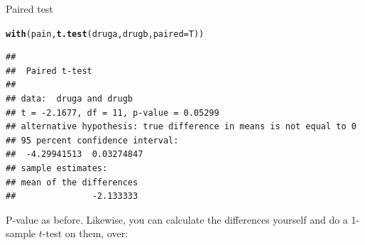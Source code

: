 \documentclass[unknownkeysallowed]{beamer}\usepackage[]{graphicx}\usepackage[]{color}
\makeatletter
\newcommand{\hlstd}[1]{\textcolor[rgb]{0.345,0.345,0.345}{#1}}%
\newcommand{\hlkwc}[1]{\textcolor[rgb]{0.333,0.667,0.333}{#1}}%
\newcommand{\hlkwd}[1]{\textcolor[rgb]{0.737,0.353,0.396}{\textbf{#1}}}%
\newenvironment{kframe}{%
 \def\at@end@of@kframe{}%
 \ifinner\ifhmode%
  \def\at@end@of@kframe{\end{minipage}}%
  \begin{minipage}{\columnwidth}%
 \fi\fi%
 \def\FrameCommand##1{\hskip\@totalleftmargin \hskip-\fboxsep
 \colorbox{shadecolor}{##1}\hskip-\fboxsep
     \hskip-\linewidth \hskip-\@totalleftmargin \hskip\columnwidth}%
 \MakeFramed {\advance\hsize-\width
   \@totalleftmargin\z@ \linewidth\hsize
   \@setminipage}}%
 {\par\unskip\endMakeFramed%
 \at@end@of@kframe}
\newenvironment{knitrout}{}{} %
\makeatother
\begin{document}
\begin{frame}[fragile]{Paired test}

  
\begin{knitrout}
\color{fgcolor}\begin{kframe}
\begin{alltt}
\hlkwd{with}\hlstd{(pain,}\hlkwd{t.test}\hlstd{(druga,drugb,}\hlkwc{paired}\hlstd{=T))}
\end{alltt}
\begin{verbatim}
## 
## 	Paired t-test
## 
## data:  druga and drugb
## t = -2.1677, df = 11, p-value = 0.05299
## alternative hypothesis: true difference in means is not equal to 0
## 95 percent confidence interval:
##  -4.29941513  0.03274847
## sample estimates:
## mean of the differences 
##               -2.133333
\end{verbatim}
\end{kframe}
\end{knitrout}

P-value as before. Likewise, you can calculate the differences
yourself and do a 1-sample $t$-test on them, over:
  
\end{frame}
\end{document}
